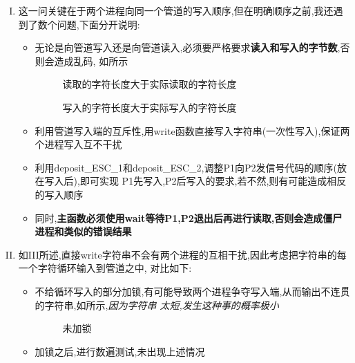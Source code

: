 \documentclass[UTF8]{ctexart}
\begin{document}
\begin{enumerate}[I.]
    \item 这一问关键在于两个进程向同一个管道的写入顺序,但在明确顺序之前,我还遇到了数个问题,下面分开说明:
    \begin{itemize}
        \item 无论是向管道写入还是向管道读入,必须要严格要求\textbf{读入和写入的字节数},否则会造成乱码,
        如所示
        \begin{figure}[htb]
            \centering
            \caption{读取的字符长度大于实际读取的字符长度}
            \label{fig_3}
        \end{figure}
        \begin{figure}[htb]
            \centering
            \caption{写入的字符长度大于实际写入的字符长度}
            \label{fig_4}
        \end{figure}
        \item 利用管道写入端的互斥性,用write函数直接写入字符串(一次性写入),保证两个进程写入互不干扰
        \item 利用deposit\_ESC\_1和deposit\_ESC\_2,调整P1向P2发信号代码的顺序(放在写入后),即可实现
        P1先写入,P2后写入的要求,若不然,则有可能造成相反的写入顺序
        \item 同时,\textbf{主函数必须使用wait等待P1,P2退出后再进行读取,否则会造成僵尸进程和类似的错误结果}
    \end{itemize}
    \item 如III所述,直接write字符串不会有两个进程的互相干扰,因此考虑把字符串的每一个字符循环输入到管道之中,
    对比如下:
    \begin{itemize}
        \item 不给循环写入的部分加锁,有可能导致两个进程争夺写入端,从而输出不连贯的字符串,如所示,\emph{因为字符串
        太短,发生这种事的概率极小}
        \begin{figure}[htb]
            \centering
            
            \caption{未加锁}
            \label{fig_5}
        \end{figure}
        \item 加锁之后,进行数遍测试,未出现上述情况
    \end{itemize}
    
\end{enumerate}

\clearpage
\end{document}
